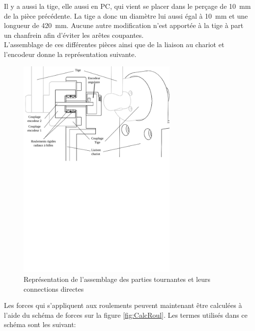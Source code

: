 Il y a aussi la tige, elle aussi en \acrshort{PC}, qui vient se placer dans le perçage de 10~mm de la pièce précédente. La tige a donc un
diamètre lui aussi égal à 10~mm et une longueur de 420~mm. Aucune autre modification n'est apportée à la tige à part un chanfrein afin d'éviter
les arêtes coupantes.\\

L'assemblage de ces différentes pièces ainsi que de la liaison au chariot et l'encodeur donne la représentation suivante.

\begin{figure}[H]
  \centering
  \includegraphics[width = 0.7\textwidth]{assets/figures/AssemblagePartieTournante.svg}
  \caption{Représentation de l'assemblage des parties tournantes et leurs connections directes}
  \label{fig:AssPartieTour}
\end{figure}

Les forces qui s'appliquent aux roulements peuvent maintenant être calculées à l'aide du schéma de forces sur la figure \ref{fig:CalcRoul}.
Les termes utilisés dans ce schéma sont les suivant:

